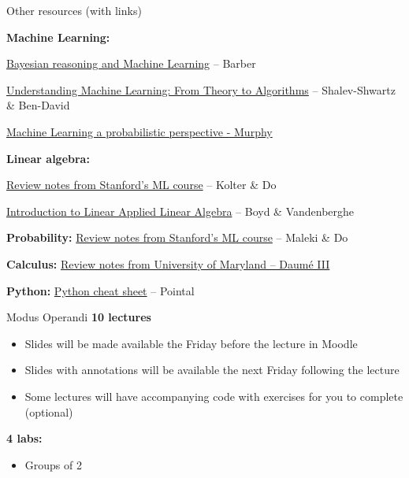 \documentclass[aspectratio=169,10pt]{beamer}
\begin{document}
\begin{frame}{Other resources (with links)}
	
	{\footnotesize \textbf{Machine Learning:}}
	\begin{itemize}
		{\footnotesize
			\item \href{http://web4.cs.ucl.ac.uk/staff/D.Barber/textbook/091117.pdf}{Bayesian reasoning and Machine Learning} – Barber
			\item \href{http://www.cs.huji.ac.il/~shais/UnderstandingMachineLearning/copy.html}{Understanding Machine Learning: From Theory to Algorithms} – Shalev-Shwartz \& Ben-David }
		    \item \href{http://noiselab.ucsd.edu/ECE228/Murphy_Machine_Learning.pdf}{\footnotesize Machine Learning a probabilistic perspective - Murphy}
	\end{itemize}

	{\footnotesize 	\textbf{Linear algebra:}}

\begin{itemize}
	{\footnotesize
		\item \href{http://cs229.stanford.edu/section/cs229-linalg.pdf}{Review notes from Stanford’s ML course} – Kolter \& Do
		\item \href{http://vmls-book.stanford.edu/vmls.pdf}{Introduction to Linear Applied Linear Algebra} – Boyd \& Vandenberghe}
\end{itemize}
	
	{\footnotesize \textbf{Probability:} 
			\href{http://cs229.stanford.edu/section/cs229-prob.pdf}{Review notes from Stanford’s ML course} – Maleki \& Do }
		

	{\footnotesize 	\textbf{Calculus:} 
			 \href{http://users.umiacs.umd.edu/~hal/courses/2013S_ML/math4ml.pdf}{Review notes from University of Maryland – Daumé III}}

	{\footnotesize \textbf{Python:} 
	\href{https://perso.limsi.fr/pointal/_media/python:cours:mementopython3-english.pdf}{Python cheat sheet} – Pointal }
	
\end{frame}

\begin{frame}{Modus Operandi}
	\textbf{10 lectures }
	\begin{itemize}
		\item Slides will be made available the Friday before the lecture in Moodle
		\item Slides with annotations will be available the next Friday following the lecture
		\item Some lectures will have accompanying code with exercises for you to complete (optional)
	\end{itemize}
	
	\textbf{4 labs:}
	\begin{itemize}
		\item Groups of 2 
	\end{itemize}
\end{frame}
\end{document}
